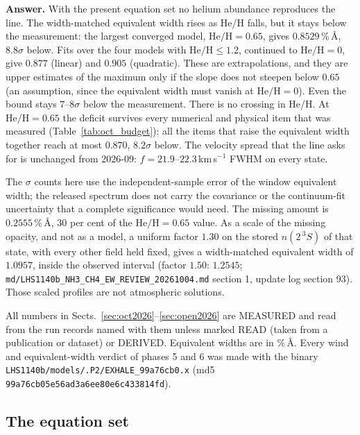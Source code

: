 \documentclass[english,a4paper]{my_memo}
\begin{document}
\medskip
\noindent\textbf{Answer.} With the present equation set no helium abundance
reproduces the line. The width-matched equivalent width rises as He/H
falls, but it stays below the measurement: the largest converged model,
$\mathrm{He/H} = 0.65$, gives $0.8529$\,\%\,\AA, $8.8\sigma$ below. Fits
over the four models with $\mathrm{He/H} \le 1.2$, continued to
$\mathrm{He/H} = 0$, give $0.877$ (linear) and $0.905$ (quadratic). These are
extrapolations, and they are upper estimates of the maximum only if the
slope does not steepen below $0.65$ (an assumption, since the equivalent
width must vanish at $\mathrm{He/H} = 0$). Even the bound stays $7$--$8\sigma$
below the measurement. There is no crossing in He/H. At $\mathrm{He/H} =
0.65$ the deficit survives every numerical and physical item that was
measured (Table~\ref{tab:oct_budget}): all the items that raise the
equivalent width together reach at most $0.870$, $8.2\sigma$ below. The
velocity spread that the line asks for is unchanged from 2026-09:
$f = 21.9$--$22.3$\,km\,s$^{-1}$ FWHM on every state.

The $\sigma$ counts here use the independent-sample error of the window
equivalent width; the released spectrum does not carry the covariance or the
continuum-fit uncertainty that a complete significance would need. The
missing amount is $0.2555$\,\%\,\AA, $30$ per cent of the
$\mathrm{He/H} = 0.65$ value. As a scale of the missing opacity, and not as
a model, a uniform factor $1.30$ on the stored $n(2\,^3S)$ of that state,
with every other field held fixed, gives a width-matched equivalent width of
$1.0957$, inside the observed interval (factor $1.50$: $1.2545$;
\texttt{md/LHS1140b\_NH3\_CH4\_EW\_REVIEW\_20261004.md} section 1, update
log section 93). Those scaled profiles are not atmospheric solutions.

All numbers in Sects.~\ref{sec:oct2026}--\ref{sec:open2026} are MEASURED and
read from the run records named with them unless marked READ (taken from a
publication or dataset) or DERIVED. Equivalent widths are in \%\,\AA.
Every wind and equivalent-width verdict of phases 5 and 6 was made with the
binary \texttt{LHS1140b/models/.P2/EXHALE\_99a76cb0.x} (md5
\texttt{99a76cb05e56ad3a6ee80e6c433814fd}).

\subsection{The equation set}
\label{sec:oct_equations}
\end{document}
